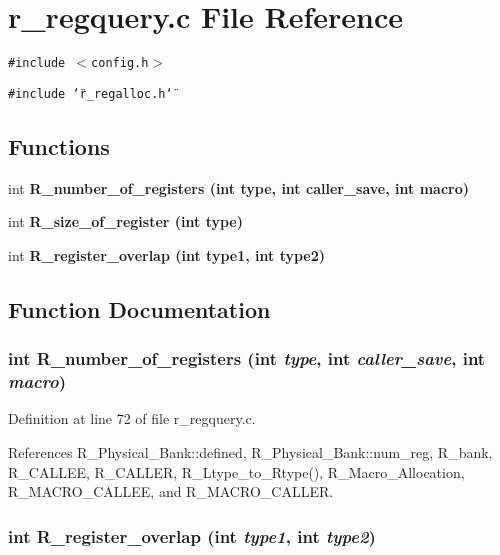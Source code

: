 \section{r\_\-regquery.c File Reference}
\label{r__regquery_8c}
{\tt \#include $<$config.h$>$}\par
{\tt \#include \char`\"{}r\_\-regalloc.h\char`\"{}}\par
\subsection*{Functions}
\begin{CompactItemize}
\item 
int \bf{R\_\-number\_\-of\_\-registers} (int type, int caller\_\-save, int macro)
\item 
int \bf{R\_\-size\_\-of\_\-register} (int type)
\item 
int \bf{R\_\-register\_\-overlap} (int type1, int type2)
\end{CompactItemize}


\subsection{Function Documentation}
\subsubsection{\setlength{\rightskip}{0pt plus 5cm}int R\_\-number\_\-of\_\-registers (int {\em type}, int {\em caller\_\-save}, int {\em macro})}\label{r__regquery_8c_fe09737d3ae741f7b797fec592c32fd9}




Definition at line 72 of file r\_\-regquery.c.

References R\_\-Physical\_\-Bank::defined, R\_\-Physical\_\-Bank::num\_\-reg, R\_\-bank, R\_\-CALLEE, R\_\-CALLER, R\_\-Ltype\_\-to\_\-Rtype(), R\_\-Macro\_\-Allocation, R\_\-MACRO\_\-CALLEE, and R\_\-MACRO\_\-CALLER.
\subsubsection{\setlength{\rightskip}{0pt plus 5cm}int R\_\-register\_\-overlap (int {\em type1}, int {\em type2})}\label{r__regquery_8c_11b01187580a0bd6bf0ba564f5656f78}




